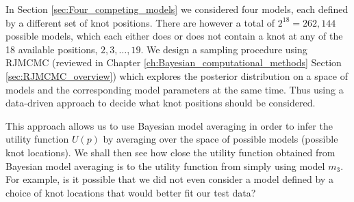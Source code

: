 In Section \ref{sec:Four_competing_models} we considered four models, each defined by a different set of knot positions.
There are however a total of \(2^{18} = 262,144\) possible models, which each either does or does not contain a knot at
any of the 18 available positions, \(2, 3, \ldots, 19\). We design a sampling procedure using \gls{RJMCMC} (reviewed in
Chapter \ref{ch:Bayesian_computational_methods} Section \ref{sec:RJMCMC_overview}) which explores the posterior
distribution on a space of models and the corresponding model parameters at the same time. Thus using a data-driven
approach to decide what knot positions should be considered.

This approach allows us to use Bayesian model averaging in order to infer the utility function \(U(p)\) by averaging
over the space of possible models (possible knot locations). We shall then see how close the utility function obtained
from Bayesian model averaging is to the utility function from simply using model \(m_3\). For example, is it possible
that we did not even consider a model defined by a choice of knot locations that would better fit our test data?
 
